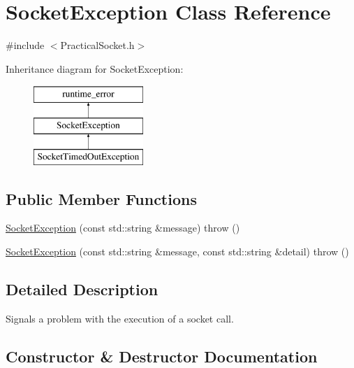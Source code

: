 \hypertarget{class_socket_exception}{}\section{Socket\+Exception Class Reference}
\label{class_socket_exception}


{\ttfamily \#include $<$Practical\+Socket.\+h$>$}

Inheritance diagram for Socket\+Exception\+:\begin{figure}[H]
\begin{center}
\leavevmode
\includegraphics[height=3.000000cm]{class_socket_exception}
\end{center}
\end{figure}
\subsection*{Public Member Functions}
\begin{DoxyCompactItemize}
\item 
\hyperlink{class_socket_exception_af47539ffffa68622ca8107eba744891a}{Socket\+Exception} (const std\+::string \&message)  throw ()
\item 
\hyperlink{class_socket_exception_a1a6e609513da7180fe3fb6fcb1dc714a}{Socket\+Exception} (const std\+::string \&message, const std\+::string \&detail)  throw ()
\end{DoxyCompactItemize}


\subsection{Detailed Description}
Signals a problem with the execution of a socket call. 

\subsection{Constructor \& Destructor Documentation}

